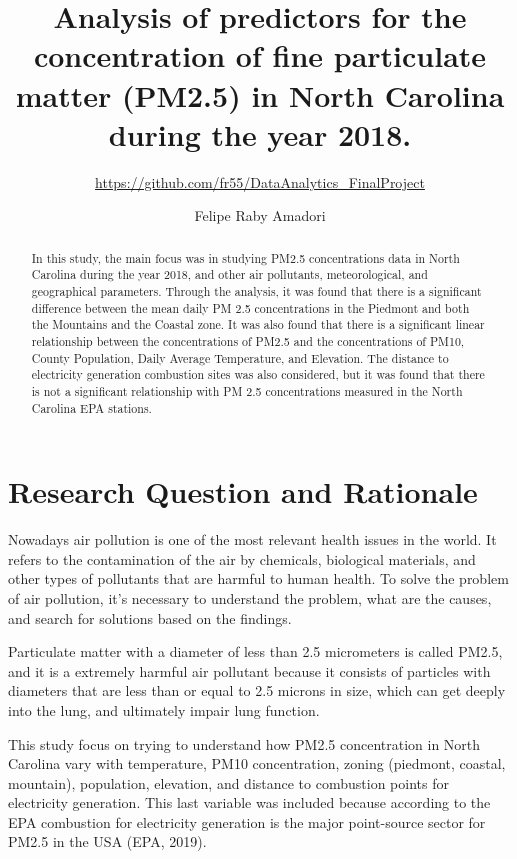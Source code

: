 \documentclass[12pt,]{article}
\title{Analysis of predictors for the concentration of fine particulate matter
(PM2.5) in North Carolina during the year 2018.}
\subtitle{\url{https://github.com/fr55/DataAnalytics_FinalProject}}
\author{Felipe Raby Amadori}
\date{}
\begin{document}
\maketitle
\begin{abstract}
In this study, the main focus was in studying PM2.5 concentrations data
in North Carolina during the year 2018, and other air pollutants,
meteorological, and geographical parameters. Through the analysis, it
was found that there is a significant difference between the mean daily
PM 2.5 concentrations in the Piedmont and both the Mountains and the
Coastal zone. It was also found that there is a significant linear
relationship between the concentrations of PM2.5 and the concentrations
of PM10, County Population, Daily Average Temperature, and Elevation.
The distance to electricity generation combustion sites was also
considered, but it was found that there is not a significant
relationship with PM 2.5 concentrations measured in the North Carolina
EPA stations.
\end{abstract}

\newpage

\tableofcontents  \newpage
\listoftables  \newpage
\listoffigures  \newpage

\section{Research Question and
Rationale}\label{research-question-and-rationale}

Nowadays air pollution is one of the most relevant health issues in the
world. It refers to the contamination of the air by chemicals,
biological materials, and other types of pollutants that are harmful to
human health. To solve the problem of air pollution, it's necessary to
understand the problem, what are the causes, and search for solutions
based on the findings.

Particulate matter with a diameter of less than 2.5 micrometers is
called PM2.5, and it is a extremely harmful air pollutant because it
consists of particles with diameters that are less than or equal to 2.5
microns in size, which can get deeply into the lung, and ultimately
impair lung function.

This study focus on trying to understand how PM2.5 concentration in
North Carolina vary with temperature, PM10 concentration, zoning
(piedmont, coastal, mountain), population, elevation, and distance to
combustion points for electricity generation. This last variable was
included because according to the EPA combustion for electricity
generation is the major point-source sector for PM2.5 in the USA (EPA,
2019).
\end{document}

